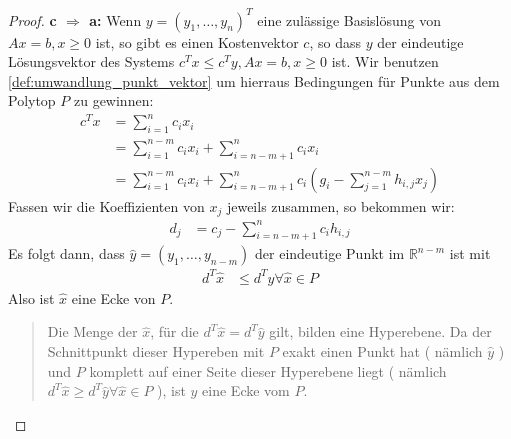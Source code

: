 \begin{proof}
\textbf{c $\Rightarrow$ a:}
Wenn $y = (y_1, \dotsc, y_n)^T$ eine zulässige Basislösung von $Ax = b, x  \geq 0$ ist, so gibt es einen Kostenvektor $c$, so dass $y$ der eindeutige Lösungsvektor des Systems $c^Tx \leq c^Ty, Ax=b, x\geq 0$ ist. Wir benutzen \ref{def:umwandlung_punkt_vektor} um hierraus Bedingungen für Punkte aus dem Polytop $P$ zu gewinnen:
\begin{align*}
c^Tx &= \sum_{i=1}^n c_ix_i \\
&=\sum_{i=1}^{n-m} c_ix_i + \sum_{i=n-m+1}^n c_ix_i \\
&=\sum_{i=1}^{n-m} c_ix_i + \sum_{i=n-m+1}^n c_i \left ( g_i - \sum_{j=1}^{n-m} h_{i,j}x_j \right )
\end{align*}
Fassen wir die Koeffizienten von $x_j$ jeweils zusammen, so bekommen wir:
\begin{align*}
d_j &= c_j - \sum_{i=n-m+1}^n c_i h_{i,j}
\end{align*}
Es folgt dann, dass $\hat{y} = (y_1,\dotsc,y_{n-m})$ der eindeutige Punkt im $\mathbb R^{n-m}$ ist mit
\begin{align*}
d^T\hat{x} &\leq d^T\hat{y} \forall \hat{x} \in P
\end{align*}
Also ist $\hat{x}$ eine Ecke von $P$.
\begin{quotation}
Die Menge der $\hat{x}$, für die $d^T\hat{x} = d^T\hat{y}$ gilt, bilden eine Hyperebene. Da der Schnittpunkt dieser Hypereben mit $P$ exakt einen Punkt hat ( nämlich $\hat{y}$ ) und $P$ komplett auf einer Seite dieser Hyperebene liegt ( nämlich $d^T\hat{x} \geq d^T\hat{y} \forall \hat{x} \in P$ ), ist $\hat{y}$ eine Ecke vom $P$. 
\end{quotation}
\end{proof}

